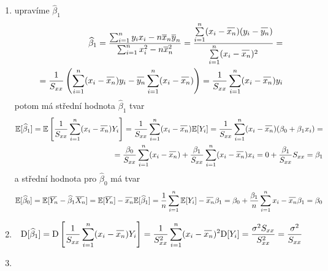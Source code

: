 \documentclass[oneside,intlimits,reqno]{scrbook}
\newcommand{\E}{\mathbb{E}} %
\newcommand{\D}{\mathrm{D}} %
\newcommand{\overbar}[1]{\mkern 1mu\overline{\mkern-1mu#1\mkern-3mu}\mkern 3mu}
\newcommand{\oxn}{\overbar{\rule{0ex}{1.33ex}X_n}}
\newcommand{\oyn}{\overbar{\rule{0ex}{1.33ex}Y_n}}
\newcommand{\oxnn}{\overbar{\rule{0ex}{1.33ex}x_n}}
\newcommand{\oynn}{\overbar{\rule{0ex}{1.33ex}y_n}}
\newcommand{\sumin}{\sum\limits_{i=1}^{n}}
\theoremstyle{definition}
\theoremstyle{plain}
\theoremstyle{remark}
\begin{document}
\begin{proofname}

   \begin{enumerate}
  \item upravíme $ \widehat{\beta}_{1} $
  		\begin{equation*}
  		\begin{aligned}
  		    \widehat{\beta}_{1} = \dfrac{\sum_{i=1}^{n} y_{i} x_{i} - n \overline{x}_{n} \overline{y}_{n}}{\sum_{i=1}^{n} x_{i}^{2} - n \overline{x}_{n}^{2}} = \frac{\sumin (x_i - \oxnn )(y_i - \oynn )}{\sumin (x_i - \oxnn )^{2}} = \\
  		    = \frac{1}{S_{xx}} \left( \sumin (x_i - \oxnn ) y_i - \oynn \sumin (x_i - \oxnn )  \right) =  \frac{1}{S_{xx}} \sumin (x_i - \oxnn ) y_i 
  		    \end{aligned}
  		\end{equation*}
  		potom má střední hodnota $ \widehat{\beta}_{1} $ tvar
  		\begin{equation*}
  		\begin{aligned}
  		    \E [ \widehat{\beta}_{1} ] = \E \left[ \frac{1}{S_{xx}} \sumin (x_i - \oxnn ) Y_i \right] = \frac{1}{S_{xx}} \sumin (x_i - \oxnn ) \E [ Y_i ] 
  		    = \frac{1}{S_{xx}} \sumin (x_i - \oxnn ) ( \beta_{0} + \beta_{1} x_i ) = \\ = \frac{\beta_{0}}{S_{xx}} \sumin (x_i - \oxnn ) + \frac{\beta_{1}}{S_{xx}} \sumin (x_i - \oxnn ) x_i = 0 + \frac{\beta_{1}}{S_{xx}} S_{xx} = \beta_{1}
  		    \end{aligned}
  		\end{equation*}
  		a střední hodnota pro $ \widehat{\beta}_{0} $ má tvar 
  		\begin{equation*}
  		\begin{aligned}
  		    \E [ \widehat{\beta}_{0} ] = \E [ \oyn - \widehat{\beta}_{1} \oxn ] = \E [ \oyn ] - \oxnn \E [ \widehat{\beta}_{1} ] = \dfrac{1}{n} \sumin \E [ Y_i ] - \oxnn \beta_1 = \beta_0 + \frac{\beta_1}{n} \sumin x_i - \oxnn \beta_1 = \beta_0
  		    \end{aligned}
  		\end{equation*}
  \item \begin{equation*}
  			\D [ \widehat{\beta}_{1} ] = \D \left[ \frac{1}{S_{xx}} \sumin (x_i - \oxnn ) Y_i \right] = \frac{1}{S_{xx} ^{2}} \sumin (x_i - \oxnn )^{2} \D [ Y_i ] = \frac{\sigma^{2} S_{xx}}{S_{xx}^{2}} = \frac{\sigma^{2}}{S_{xx}}
  		\end{equation*}
  \item  \begin{equation*}

\end{equation*}
\end{enumerate}
\end{proofname}
\end{document}
